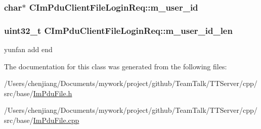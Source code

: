 \subsubsection[{m\+\_\+user\+\_\+id}]{\setlength{\rightskip}{0pt plus 5cm}char$\ast$ C\+Im\+Pdu\+Client\+File\+Login\+Req\+::m\+\_\+user\+\_\+id\hspace{0.3cm}{\ttfamily [private]}}\label{class_c_im_pdu_client_file_login_req_a7dbf18d3e55c5b33fc94a2c0306a2192}
\hypertarget{class_c_im_pdu_client_file_login_req_a58bae7775536d2dae8feba8826b66539}{}
\subsubsection[{m\+\_\+user\+\_\+id\+\_\+len}]{\setlength{\rightskip}{0pt plus 5cm}uint32\+\_\+t C\+Im\+Pdu\+Client\+File\+Login\+Req\+::m\+\_\+user\+\_\+id\+\_\+len\hspace{0.3cm}{\ttfamily [private]}}\label{class_c_im_pdu_client_file_login_req_a58bae7775536d2dae8feba8826b66539}


yunfan add end 



The documentation for this class was generated from the following files\+:\begin{DoxyCompactItemize}
\item 
/\+Users/chenjiang/\+Documents/mywork/project/github/\+Team\+Talk/\+T\+T\+Server/cpp/src/base/\hyperlink{_im_pdu_file_8h}{Im\+Pdu\+File.\+h}\item 
/\+Users/chenjiang/\+Documents/mywork/project/github/\+Team\+Talk/\+T\+T\+Server/cpp/src/base/\hyperlink{_im_pdu_file_8cpp}{Im\+Pdu\+File.\+cpp}\end{DoxyCompactItemize}
